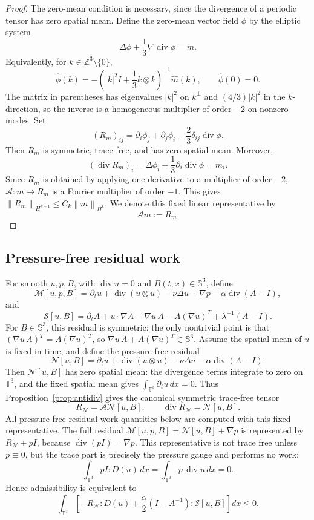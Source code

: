 \documentclass[11pt]{article}
\numberwithin{equation}{section}
\newcommand{\T}{\mathbb T}
\newcommand{\Id}{I}
\newcommand{\Sym}{\mathbb S}
\newcommand{\divv}{\operatorname{div}}
\newcommand{\calM}{\mathcal M}
\newcommand{\calN}{\mathcal N}
\newcommand{\calS}{\mathcal S}
\newcommand{\calA}{\mathcal A}
\newcommand{\norm}[1]{\left\lVert #1\right\rVert}
\begin{document}
\begin{proof}
The zero-mean condition is necessary, since the divergence of a periodic
tensor has zero spatial mean.  Define the zero-mean vector field \(\phi\) by
the elliptic system
\[
  \Delta\phi+\frac13\nabla\divv\phi=m .
\]
Equivalently, for \(k\in\mathbb Z^3\setminus\{0\}\),
\[
  \widehat\phi(k)
  =
  -\left(|k|^2\Id+\frac13 k\otimes k\right)^{-1}\widehat m(k),
  \qquad
  \widehat\phi(0)=0 .
\]
The matrix in parentheses has eigenvalues \(|k|^2\) on \(k^\perp\) and
\((4/3)|k|^2\) in the \(k\)-direction, so the inverse is a homogeneous
multiplier of order \(-2\) on nonzero modes.  Set
\[
  (R_m)_{ij}
  =
  \partial_i\phi_j+\partial_j\phi_i-\frac23\delta_{ij}\divv\phi .
\]
Then \(R_m\) is symmetric, trace free, and has zero spatial mean.  Moreover,
\[
  (\divv R_m)_i
  =
  \Delta\phi_i+\frac13\partial_i\divv\phi=m_i .
\]
Since \(R_m\) is obtained by applying one derivative to a multiplier of order
\(-2\), \(\calA:m\mapsto R_m\) is a Fourier multiplier of order \(-1\).  This
gives \(\norm{R_m}_{H^{k+1}}\le C_k\norm{m}_{H^k}\).  We denote this fixed
linear representative by
\[
  \calA m:=R_m .
\]
\end{proof}

\subsection{Pressure-free residual work}

For smooth \(u,p,B\), with \(\divv u=0\) and \(B(t,x)\in\Sym^3\), define
\[
  \calM[u,p,B]
  =
  \partial_t u+\divv(u\otimes u)-\nu\Delta u+\nabla p
  -\alpha\divv(A-\Id),
\]
and
\[
  \calS[u,B]
  =
  \partial_t A+u\cdot\nabla A-\nabla u\,A-A(\nabla u)^T+\lambda^{-1}(A-\Id).
\]
For \(B\in\Sym^3\), this residual is symmetric: the only nontrivial point is
that \((\nabla u\,A)^T=A(\nabla u)^T\), so
\(\nabla u\,A+A(\nabla u)^T\in\Sym^3\).
Assume the spatial mean of \(u\) is fixed in time, and define the
pressure-free residual
\[
  \calN[u,B]
  =
  \partial_t u+\divv(u\otimes u)-\nu\Delta u-\alpha\divv(A-\Id).
\]
Then \(\calN[u,B]\) has zero spatial mean: the divergence terms integrate to
zero on \(\T^3\), and the fixed spatial mean gives
\(\int_{\T^3}\partial_t u\,dx=0\).  Thus Proposition~\ref{prop:antidiv}
gives the canonical symmetric trace-free tensor
\[
  R_{\calN}=\calA\calN[u,B],
  \qquad
  \divv R_{\calN}=\calN[u,B].
\]
All pressure-free residual-work quantities below are computed with this fixed
representative.  The full residual
\(\calM[u,p,B]=\calN[u,B]+\nabla p\) is represented by
\(R_{\calN}+p\Id\), because \(\divv(p\Id)=\nabla p\).  This representative is
not trace free unless \(p\equiv0\), but the trace part is precisely the
pressure gauge and performs no work:
\[
  \int_{\T^3}p\Id:D(u)\,dx
  =
  \int_{\T^3}p\,\divv u\,dx=0 .
\]
Hence admissibility is equivalent to
\begin{equation}
  \int_{\T^3}
  \left[
  -R_{\calN}:D(u)
  +\frac{\alpha}{2}(\Id-A^{-1}):\calS[u,B]
  \right]dx
  \le0 .
  \label{eq:pressure-free}
\end{equation}
\end{document}
